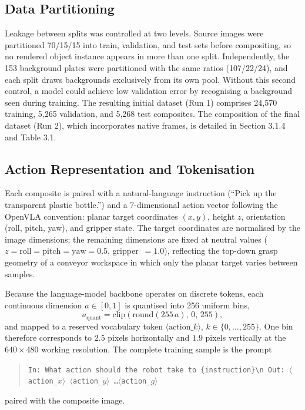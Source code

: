 \subsection{Data Partitioning}
\label{subsec:partitioning}

Leakage between splits was controlled at two levels. Source images were partitioned 70/15/15 into train, validation, and test sets before compositing, so no rendered object instance appears in more than one split. Independently, the 153 background plates were partitioned with the same ratios (107/22/24), and each split draws backgrounds exclusively from its own pool. Without this second control, a model could achieve low validation error by recognising a background seen during training. 
The resulting initial dataset (Run 1) comprises 24,570 training, 5,265 validation, and 5,268 test composites. The composition of the final dataset (Run 2), which incorporates native frames, is detailed in Section 3.1.4 and Table 3.1.
\subsection{Action Representation and Tokenisation}
\label{subsec:action_tokens}

Each composite is paired with a natural-language instruction (``Pick up the transparent plastic bottle.'') and a 7-dimensional action vector following the OpenVLA convention: planar target coordinates $(x, y)$, height $z$, orientation (roll, pitch, yaw), and gripper state. The target coordinates are normalised by the image dimensions; the remaining dimensions are fixed at neutral values ($z = \mathrm{roll} = \mathrm{pitch} = \mathrm{yaw} = 0.5$, gripper~$= 1.0$), reflecting the top-down grasp geometry of a conveyor workspace in which only the planar target varies between samples.

Because the language-model backbone operates on discrete tokens, each continuous dimension $a \in [0, 1]$ is quantised into 256 uniform bins,
\begin{equation}
    a_{\mathrm{quant}} = \mathrm{clip}\!\left(\mathrm{round}(255\,a),\, 0,\, 255\right),
\end{equation}
and mapped to a reserved vocabulary token $\langle \mathrm{action}\_k \rangle$, $k \in \{0, \dots, 255\}$. One bin therefore corresponds to $2.5$ pixels horizontally and $1.9$ pixels vertically at the $640 \times 480$ working resolution. The complete training sample is the prompt
\begin{quote}
\texttt{In: What action should the robot take to \{instruction\}\textbackslash n Out: $\langle$action\_$x\rangle$ $\langle$action\_$y\rangle$ \dots $\langle$action\_$g\rangle$}
\end{quote}
paired with the composite image.

